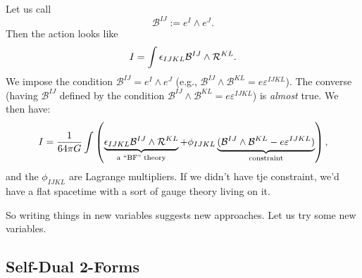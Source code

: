 Let us call
\begin{equation}
\mathcal{B}^{IJ} := e^{I}\wedge e^{J}.
\end{equation}
Then the action looks like
\begin{equation}
I = \int\epsilon_{IJKL}\mathcal{B}^{IJ}\wedge\mathcal{R}^{KL}.
\end{equation}
We impose the condition $\mathcal{B}^{IJ} = e^{I}\wedge e^{J}$ (e.g.,
$\mathcal{B}^{IJ}\wedge\mathcal{B}^{KL} = e\varepsilon^{IJKL}$). The
converse (having $\mathcal{B}^{IJ}$ defined  by the condition
$\mathcal{B}^{IJ}\wedge\mathcal{B}^{KL} = e\varepsilon^{IJKL}$) is
\emph{almost} true. We then have:
\begin{equation}
  I = \frac{1}{64\pi G}\int\left(
  \underbrace{\epsilon_{IJKL}\mathcal{B}^{IJ}\wedge\mathcal{R}^{KL}}_{\text{a ``BF'' theory}}
  + \phi_{IJKL}\underbrace{(\mathcal{B}^{IJ}\wedge\mathcal{B}^{KL} - e\varepsilon^{IJKL})}_{\text{constraint}}
  \right),
\end{equation}
and the $\phi_{IJKL}$ are Lagrange multipliers. If we didn't have tje
constraint, we'd have a flat spacetime with a sort of gauge theory
living on it. %

So writing things in new variables suggests new approaches.
Let us try some new variables.

\subsection{Self-Dual 2-Forms}

